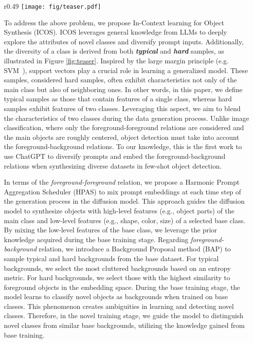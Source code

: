 \begin{wrapfigure}{r}{0.49\textwidth}
    \centering
\texttt{[image: fig/teaser.pdf]}
    \caption{T-SNE visualization of novel synthetic samples and base real samples in Novel Set 1 of PASCAL VOC. . Typical and hard samples in novel classes are created by using  and HPAS, respectively. .
    }
     \label{fig:teaser}
\end{wrapfigure}

To address the above problem, we propose In-Context learning for Object Synthesis (ICOS). ICOS leverages general knowledge from LLMs to deeply explore the attributes of novel classes and diversify prompt inputs. Additionally, the diversity of a class is derived from both \textbf{\textit{typical} }and \textbf{\textit{hard}} samples, as illustrated in Figure \ref{fig:teaser}. Inspired by the large margin principle (e.g. SVM~\citep{cortes1995support}), support vectors play a crucial role in learning a generalized model. These samples, considered hard samples, often exhibit characteristics not only of the main class but also of neighboring ones. In other words, in this paper, we define typical samples as those that contain features of a single class, whereas hard samples exhibit features of two classes. Leveraging this aspect, we aim to blend the characteristics of two classes during the data generation process. Unlike image classification, where only the foreground-foreground relations are considered and the main objects are roughly centered, object detection must take into account the foreground-background relations. To our knowledge, this is the first work to use ChatGPT to diversify prompts and embed the foreground-background relations when synthesizing diverse datasets in few-shot object detection.

In terms of the \textit{foreground-foreground} relation, we propose a Harmonic Prompt Aggregation Scheduler (HPAS) to mix prompt embeddings at each time step of the generation process in the diffusion model. This approach guides the diffusion model to synthesize objects with high-level features (e.g., object parts) of the main class and low-level features (e.g., shape, color, size) of a selected base class. By mixing the low-level features of the base class, we leverage the prior knowledge acquired during the base training stage.
Regarding \textit{foreground-background} relation, we introduce a Background Proposal method (BAP) to sample typical and hard backgrounds from the base dataset. For typical backgrounds, we select the most cluttered backgrounds based on an entropy metric. For hard backgrounds, we select those with the highest similarity to foreground objects in the embedding space. During the base training stage, the model learns to classify novel objects as backgrounds when trained on base classes. This phenomenon creates ambiguities in learning and detecting novel classes. Therefore, in the novel training stage, we guide the model to distinguish novel classes from similar base backgrounds, utilizing the knowledge gained from base training.

